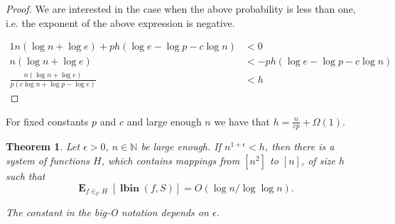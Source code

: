 \documentclass{article}
\newcommand{\lbin}[2]{\operatorname{\mathbf{lbin}}({#1}, {#2})}
\newcommand{\expects}[2]{\operatorname{\mathbf{E}}_{{#1}}\left[{#2}\right]}
\newtheorem{theorem}{Theorem}
\begin{document}
\begin{proof}
We are interested in the case when the above probability is less than one, i.e. the exponent of the above expression is negative.

\begin{alignat*}{1}
n(\log n + \log e) + ph(\log e - \log{p} -c \log n) & < 0 \\
n(\log n + \log e) & < -ph(\log e - \log{p} - c \log n) \\
\frac{n(\log n + \log e)}{p(c \log n + \log{p} - \log e )} & < h
\end{alignat*}
\end{proof}

For fixed constants $p$ and $c$ and large enough $n$ we have that $h = \frac{n}{cp} + \Omega(1)$.

\begin{theorem}
Let $\epsilon > 0$, $n \in \mathbb{N}$ be large enough. If $n^{1 + \epsilon} < h$, then there is a system of functions $H$, which contains mappings from $[n^2]$ to $[n]$, of size $h$ such that 
\[
\expects{f \in_U H}{\lbin{f}{S}} = O(\log n / \log \log n).
\]

The constant in the big-O notation depends on $\epsilon$.
\end{theorem}
\end{document}
